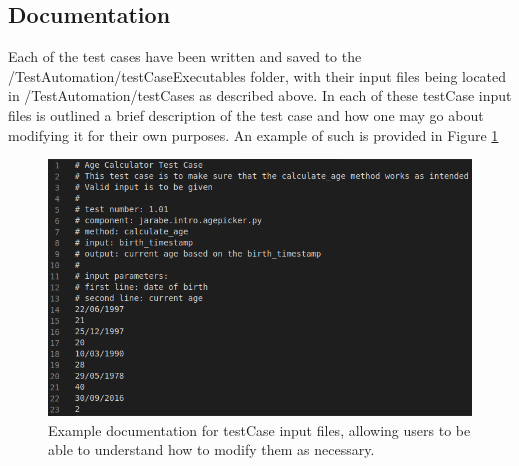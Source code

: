 \documentclass{article}
\begin{document}
\subsection{Documentation}
Each of the test cases have been written and saved to the /TestAutomation/testCaseExecutables folder, with their input files being located in /TestAutomation/testCases as described above. In each of these testCase input files is outlined a brief description of the test case and how one may go about modifying it for their own purposes. An example of such is provided in Figure \ref{Figure3}
\begin{figure}
\centering
\includegraphics[scale=0.4]{../imgs/Figure3.png}
\caption{Example documentation for testCase input files, allowing users to be able to understand how to modify them as necessary.}
\label{Figure3}
\end{figure}
\end{document}
